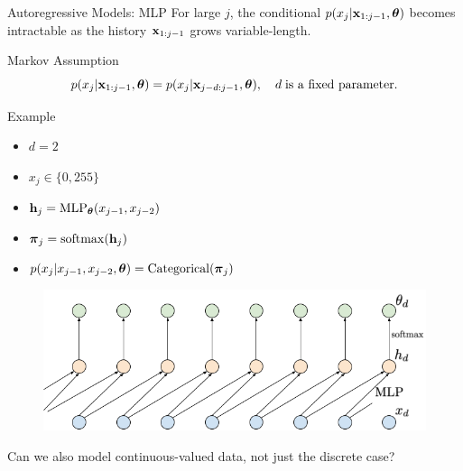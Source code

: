 \documentclass{beamer}
\begin{document}
\begin{frame}{Autoregressive Models: MLP}
	For large $j$, the conditional $p(x_j | \mathbf{x}_{1:j - 1}, \boldsymbol{\theta})$ becomes intractable as the history $\mathbf{x}_{1:j-1}$ grows variable-length.
	\begin{block}{Markov Assumption}
		\vspace{-0.5cm}
		$$
			p(x_j | \mathbf{x}_{1:j - 1}, \boldsymbol{\theta}) = p(x_j | \mathbf{x}_{j - d:j - 1}, \boldsymbol{\theta}),\quad d\;\text{is a fixed parameter}.
		$$
	\end{block}
	\vspace{-0.5cm}
	\begin{block}{Example}
		\begin{minipage}[t]{0.39\columnwidth}
			{\small
			\begin{itemize}
				\item $d = 2$
				\item $x_j \in \{0, 255\}$
				\item $\mathbf{h}_j = \mathrm{MLP}_{\boldsymbol{\theta}}(x_{j - 1}, x_{j - 2})$
				\item $\boldsymbol{\pi}_j = \mathrm{softmax}(\mathbf{h}_j)$
				\item $p(x_j | x_{j - 1}, x_{j - 2}, \boldsymbol{\theta}) = \mathrm{Categorical}(\boldsymbol{\pi}_j)$
			\end{itemize}
			}
		\end{minipage}%
		\begin{minipage}[t]{0.61\columnwidth}
			 \begin{figure}
			   \centering
			   \includegraphics[width=1.0\linewidth]{figs/sequential_MLP}
			 \end{figure}
			 Can we also model continuous-valued data, not just the discrete case?
		\end{minipage}
	\end{block}
\end{frame}
\end{document}
